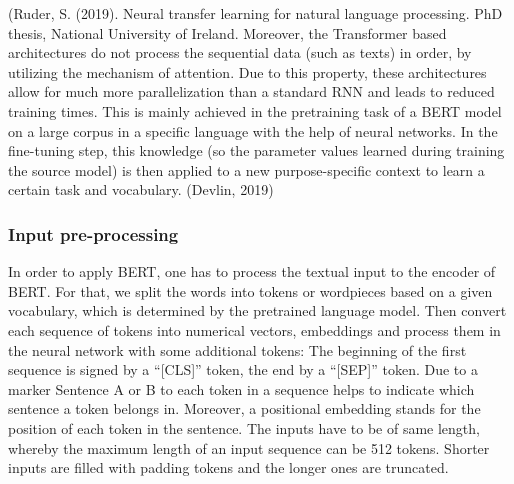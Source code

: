 (Ruder, S. (2019). Neural transfer learning for natural language
processing. PhD thesis, National University of Ireland.
Moreover, the Transformer based architectures do not process the sequential data 
(such as texts) in order, by utilizing the mechanism of attention. Due to this 
property, these architectures allow for much more parallelization than a 
standard RNN and leads to reduced training times. 
This is mainly achieved in the pretraining task of a BERT model on a large 
corpus in a specific language with the help of neural networks. In the 
fine-tuning step, this knowledge (so the parameter values learned during 
training the source model) is then applied to a new purpose-specific context to 
learn a certain task and vocabulary. (Devlin, 2019)


\subsubsection{Input pre-processing}
\label{bert_preproc}


In order to apply BERT, one has to process the textual input to the encoder of 
BERT. For that, we split the words into tokens or wordpieces based on a given 
vocabulary, which is determined by the pretrained language model. Then convert 
each sequence of tokens into numerical vectors, embeddings and process them in 
the neural network with some additional tokens: The beginning of the first 
sequence is signed by a “[CLS]” token, the end by a “[SEP]” token. Due to a 
marker Sentence A or B to each token in a sequence helps to indicate which 
sentence a token belongs in. Moreover, a positional embedding stands for the 
position of each token in the sentence. The inputs have to be of same length, 
whereby the maximum length of an input sequence can be 512 tokens. Shorter 
inputs are filled with padding tokens and the longer ones are truncated.


